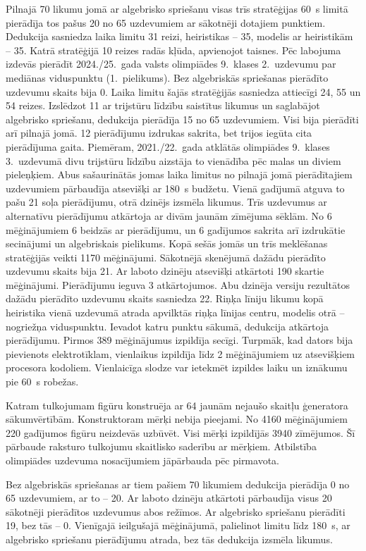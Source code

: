 Pilnajā 70 likumu jomā ar algebrisko spriešanu visas trīs stratēģijas 60~s limitā pierādīja tos pašus 20 no 65 uzdevumiem ar sākotnēji dotajiem punktiem. Dedukcija sasniedza laika limitu 31 reizi, heiristikas -- 35, modelis ar heiristikām -- 35. Katrā stratēģijā 10 reizes radās kļūda, apvienojot taisnes. Pēc labojuma izdevās pierādīt 2024./25.~gada valsts olimpiādes 9.~klases 2.~uzdevumu par mediānas viduspunktu (1.~pielikums). Bez algebriskās spriešanas pierādīto uzdevumu skaits bija 0. Laika limitu šajās stratēģijās sasniedza attiecīgi 24, 55 un 54 reizes. Izslēdzot 11 ar trijstūru līdzību saistītus likumus un saglabājot algebrisko spriešanu, dedukcija pierādīja 15 no 65 uzdevumiem. Visi bija pierādīti arī pilnajā jomā. 12 pierādījumu izdrukas sakrita, bet trijos iegūta cita pierādījuma gaita. Piemēram, 2021./22.~gada atklātās olimpiādes 9.~klases 3.~uzdevumā divu trijstūru līdzību aizstāja to vienādība pēc malas un diviem pieleņķiem. Abus sašaurinātās jomas laika limitus no pilnajā jomā pierādītajiem uzdevumiem pārbaudīja atsevišķi ar 180~s budžetu. Vienā gadījumā atguva to pašu 21 soļa pierādījumu, otrā dzinējs izsmēla likumus. Trīs uzdevumus ar alternatīvu pierādījumu atkārtoja ar divām jaunām zīmējuma sēklām. No 6 mēģinājumiem 6 beidzās ar pierādījumu, un 6 gadījumos sakrita arī izdrukātie secinājumi un algebriskais pielikums. Kopā sešās jomās un trīs meklēšanas stratēģijās veikti 1170 mēģinājumi. Sākotnējā skenējumā dažādu pierādīto uzdevumu skaits bija 21. Ar laboto dzinēju atsevišķi atkārtoti 190 skartie mēģinājumi. Pierādījumu ieguva 3 atkārtojumos. Abu dzinēja versiju rezultātos dažādu pierādīto uzdevumu skaits sasniedza 22. Riņķa līniju likumu kopā heiristika vienā uzdevumā atrada apvilktās riņķa līnijas centru, modelis otrā -- nogriežņa viduspunktu. Ievadot katru punktu sākumā, dedukcija atkārtoja pierādījumu. Pirmos 389 mēģinājumus izpildīja secīgi. Turpmāk, kad dators bija pievienots elektrotīklam, vienlaikus izpildīja līdz 2 mēģinājumiem uz atsevišķiem procesora kodoliem. Vienlaicīga slodze var ietekmēt izpildes laiku un iznākumu pie 60~s robežas.

Katram tulkojumam figūru konstruēja ar 64 jaunām nejaušo skaitļu ģeneratora sākumvērtībām. Konstruktoram mērķi nebija pieejami. No 4160 mēģinājumiem 220 gadījumos figūru neizdevās uzbūvēt. Visi mērķi izpildījās 3940 zīmējumos. Šī pārbaude raksturo tulkojumu skaitlisko saderību ar mērķiem. Atbilstība olimpiādes uzdevuma nosacījumiem jāpārbauda pēc pirmavota.

Bez algebriskās spriešanas ar tiem pašiem 70 likumiem dedukcija pierādīja 0 no 65 uzdevumiem, ar to -- 20. Ar laboto dzinēju atkārtoti pārbaudīja visus 20 sākotnēji pierādītos uzdevumus abos režīmos. Ar algebrisko spriešanu pierādīti 19, bez tās -- 0. Vienīgajā ieilgušajā mēģinājumā, palielinot limitu līdz 180~s, ar algebrisko spriešanu pierādījumu atrada, bez tās dedukcija izsmēla likumus.


